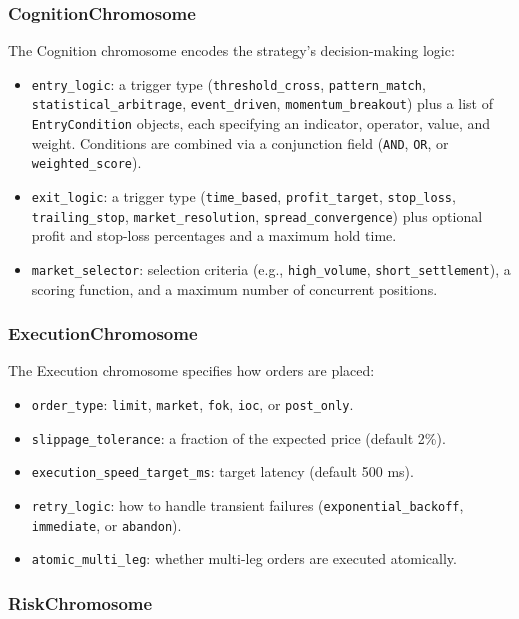 \subsubsection{CognitionChromosome}

The Cognition chromosome encodes the strategy's decision-making logic:
\begin{itemize}
    \item \texttt{entry\_logic}: a trigger type (\texttt{threshold\_cross}, \texttt{pattern\_match}, \texttt{statistical\_arbitrage}, \texttt{event\_driven}, \texttt{momentum\_breakout}) plus a list of \texttt{EntryCondition} objects, each specifying an indicator, operator, value, and weight. Conditions are combined via a conjunction field (\texttt{AND}, \texttt{OR}, or \texttt{weighted\_score}).
    \item \texttt{exit\_logic}: a trigger type (\texttt{time\_based}, \texttt{profit\_target}, \texttt{stop\_loss}, \texttt{trailing\_stop}, \texttt{market\_resolution}, \texttt{spread\_convergence}) plus optional profit and stop-loss percentages and a maximum hold time.
    \item \texttt{market\_selector}: selection criteria (e.g., \texttt{high\_volume}, \texttt{short\_settlement}), a scoring function, and a maximum number of concurrent positions.
\end{itemize}

\subsubsection{ExecutionChromosome}

The Execution chromosome specifies how orders are placed:
\begin{itemize}
    \item \texttt{order\_type}: \texttt{limit}, \texttt{market}, \texttt{fok}, \texttt{ioc}, or \texttt{post\_only}.
    \item \texttt{slippage\_tolerance}: a fraction of the expected price (default 2\%).
    \item \texttt{execution\_speed\_target\_ms}: target latency (default 500 ms).
    \item \texttt{retry\_logic}: how to handle transient failures (\texttt{exponential\_backoff}, \texttt{immediate}, or \texttt{abandon}).
    \item \texttt{atomic\_multi\_leg}: whether multi-leg orders are executed atomically.
\end{itemize}

\subsubsection{RiskChromosome}

